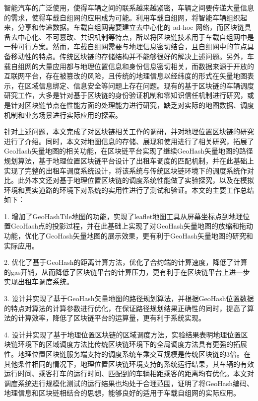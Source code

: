 

\begin{conclusion}

智能汽车的广泛使用，使得车辆之间的联系越来越紧密，车辆之间要传递大量信息的需求，使得车载自组网的应用成为可能。利用车载自组网，将智能车辆组织起来，分享和传递数据。车载自组网需要建立去中心化的 ad-hoc 网络，而区块链具备去中心化、不可篡改、共识机制等特点，所以将区块链技术用于车载自组网中是一种可行方案。然而，车载自组网需要与地理信息密切结合，且自组网中的节点具备移动性的特点。传统区块链的存储结构并不能够很好的解决上述问题。另外，车载自组网的大量应用都与地理位置信息和身份信息密切相关，而数据来源于开放的互联网平台，存在被篡改的风险，且传统的地理信息以经纬度的形式在矢量地图表示，在区域信息绑定、信息安全等问题上存在问题。现有的基于区块链的车辆调度研究工作，大多是针对基于区块链的身份验证机制和零知识信任机制进行研究，或是针对区块链节点在性能方面的处理能力进行研究，缺乏对实际的地图数据、调度机制和业务场景进行实际应用的探索。

针对上述问题，本文完成了对区块链相关工作的调研，并对地理位置区块链的研究进行了介绍。同时，本文对地图信息的存储、展现和使用进行了相关研究，拓展了GeoHash矢量地图的相关功能，在区块链平台实现了继续GeoHash矢量地图的路径规划算法，基于地理位置区块链平台设计了出租车调度的匹配机制，并在此基础上实现了完整的出租车调度系统设计，将该系统与传统区块链环境下的调度系统作对比。此外本文还对基于地理位置区块链的调度系统性能做了实验探究，以及在模拟环境和真实道路的环境下对系统的实用性进行了测试和验证。本文的主要工作总结如下：

1. 增加了GeoHashTile地图的功能，实现了leaflet地图工具从屏幕坐标点到地理位置GeoHash点的投影过程，并在此基础上实现了对GeoHash矢量地图的放缩和拖动功能，优化了GeoHash矢量地图的展示效果，更有利于GeoHash矢量地图的研究和实际应用。

2. 优化了基于GeoHash的距离计算方法，优化了合约端的计算速度，降低了计算的gas开销，从而降低了区块链平台的计算压力，更有利于在区块链平台上进一步实现出租车调度系统。

3. 设计并实现了基于GeoHash矢量地图的路径规划算法，并根据GeoHash位置数据的特点对算法的计算参数进行优化，在保证路径规划结果正确性的同时，提高了算法的计算效率，降低了区块链平台的运算量，更有利于系统实现。

4. 设计并实现了基于地理位置区块链的区域调度方法，实验结果表明地理位置区块链环境下的区域调度方法比传统区块链环境下的全局调度方法具有更强的拓展性。地理位置区块链服务端支持的调度系统车乘交互规模是传统区块链的3倍。在其他条件相同的情况下，地理位置区块链环境支持的系统运行结果，其车辆的有效运行时间、乘客打车的运行时间、匹配到的车辆相距乘客的距离均有优化。本文对调度系统进行规模化测试的运行结果也均处于合理范围，证明了将GeoHash编码、地理信息和区块链相结合的思想，能够良好的适用于车载自组网的实际应用。


\end{conclusion}
